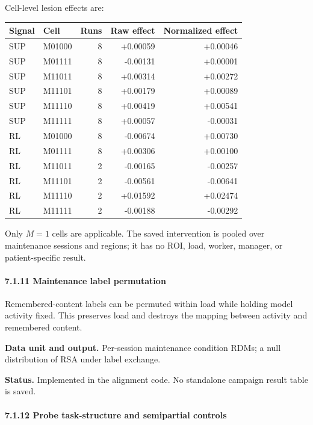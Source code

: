 \documentclass[
  10pt,
]{article}
\begin{document}
Cell-level lesion effects are:

\begin{longtable}[]{@{}llrrr@{}}
\toprule\noalign{}
Signal & Cell & Runs & Raw effect & Normalized effect \\
\midrule\noalign{}
\endhead
\bottomrule\noalign{}
\endlastfoot
SUP & M01000 & 8 & +0.00059 & +0.00046 \\
SUP & M01111 & 8 & -0.00131 & +0.00001 \\
SUP & M11011 & 8 & +0.00314 & +0.00272 \\
SUP & M11101 & 8 & +0.00179 & +0.00089 \\
SUP & M11110 & 8 & +0.00419 & +0.00541 \\
SUP & M11111 & 8 & +0.00057 & -0.00031 \\
RL & M01000 & 8 & -0.00674 & +0.00730 \\
RL & M01111 & 8 & +0.00306 & +0.00100 \\
RL & M11011 & 2 & -0.00165 & -0.00257 \\
RL & M11101 & 2 & -0.00561 & -0.00641 \\
RL & M11110 & 2 & +0.01592 & +0.02474 \\
RL & M11111 & 2 & -0.00188 & -0.00292 \\
\end{longtable}

Only \(M=1\) cells are applicable. The saved intervention is pooled over
maintenance sessions and regions; it has no ROI, load, worker, manager,
or patient-specific result.

\hypertarget{maintenance-label-permutation}{%
\paragraph{7.1.11 Maintenance label
permutation}\label{maintenance-label-permutation}}

Remembered-content labels can be permuted within load while holding
model activity fixed. This preserves load and destroys the mapping
between activity and remembered content.

\textbf{Data unit and output.} Per-session maintenance condition RDMs; a
null distribution of RSA under label exchange.

\textbf{Status.} Implemented in the alignment code. No standalone
campaign result table is saved.

\hypertarget{probe-task-structure-and-semipartial-controls}{%
\paragraph{7.1.12 Probe task-structure and semipartial
controls}\label{probe-task-structure-and-semipartial-controls}}
\end{document}
